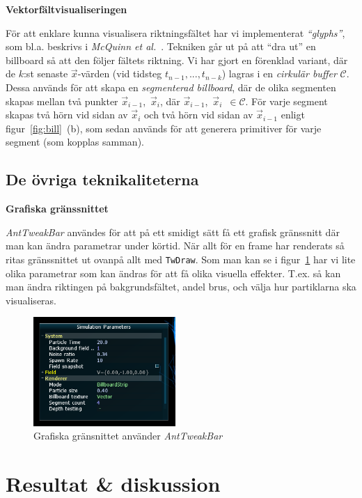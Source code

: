 \documentclass[a4paper]{article}
\begin{document}
\begin{multicols}{2}
\textbf{Vektorfältvisualiseringen}

För att enklare kunna visualisera riktningsfältet har vi implementerat \emph{``glyphs''}, som bl.a. beskrivs i \emph{McQuinn et al.}~\cite{mcquinn2013glyphsea}. Tekniken går ut på att ``dra ut'' en billboard så att den följer fältets riktning. Vi har gjort en förenklad variant, där de \(k\):st senaste \(\vec{x}\)-värden (vid tidsteg \(t_{n-1}, ..., t_{n-k}\)) lagras i en \emph{cirkulär buffer} \(\mathcal{C}\). Dessa används för att skapa en \emph{segmenterad billboard}, där de olika segmenten skapas mellan två punkter \(\vec{x}_{i-1}\),~\(\vec{x}_i\), där \(\vec{x}_{i-1}\),~\(\vec{x}_i\)~\(\in \mathcal{C}\). För varje segment skapas två hörn vid sidan av \(\vec{x}_i\) och två hörn vid sidan av \(\vec{x}_{i-1}\) enligt figur~\ref{fig:bill}~(b), som sedan används för att generera primitiver för varje segment (som kopplas samman).

\subsection{De övriga teknikaliteterna}

\textbf{Grafiska gränssnittet}

\textit{AntTweakBar} användes för att på ett smidigt sätt få ett grafisk gränssnitt där man kan ändra parametrar under körtid. När allt för en frame har renderats så ritas gränssnittet ut ovanpå allt med \texttt{TwDraw}. Som man kan se i figur~\ref{fig:atb} har vi lite olika parametrar som kan ändras för att få olika visuella effekter. T.ex. så kan man ändra riktingen på bakgrundsfältet, andel brus, och välja hur partiklarna ska visualiseras.

\begin{figure}[H]
\center
\includegraphics[width=0.48\textwidth]{share/atb.png}
\caption{Grafiska gränsnittet använder \textit{AntTweakBar}}
\label{fig:atb}
\end{figure}

\clearpage

\section{Resultat \& diskussion} \label{sec:results}


\end{multicols}
\end{document}
